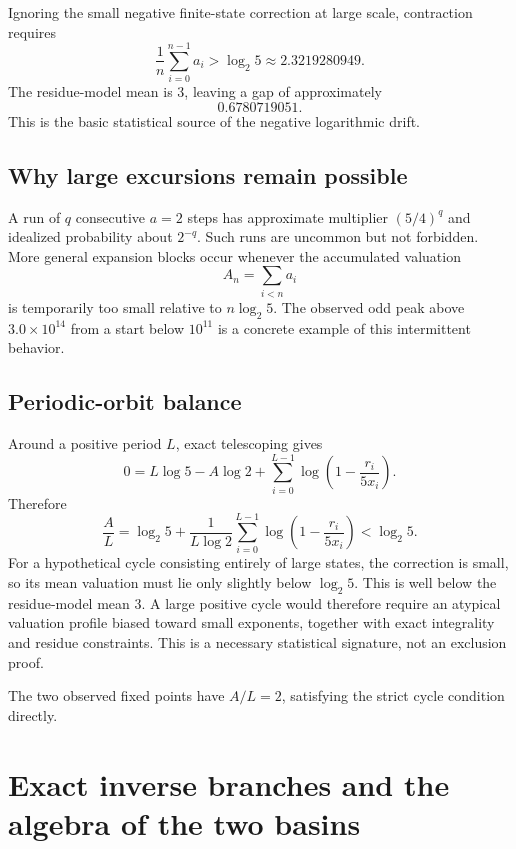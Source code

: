\documentclass[11pt]{article}
\begin{document}
Ignoring the small negative finite-state correction at large scale, contraction requires
\[
\frac1n\sum_{i=0}^{n-1}a_i
>
\log_2 5
\approx2.3219280949.
\]
The residue-model mean is $3$, leaving a gap of approximately
\[
0.6780719051.
\]
This is the basic statistical source of the negative logarithmic drift.

\subsection{Why large excursions remain possible}

A run of $q$ consecutive $a=2$ steps has approximate multiplier $(5/4)^q$ and idealized probability about $2^{-q}$. Such runs are uncommon but not forbidden. More general expansion blocks occur whenever the accumulated valuation
\[
A_n=\sum_{i<n}a_i
\]
is temporarily too small relative to $n\log_2 5$. The observed odd peak above $3.0\times10^{14}$ from a start below $10^{11}$ is a concrete example of this intermittent behavior.

\subsection{Periodic-orbit balance}

Around a positive period $L$, exact telescoping gives
\begin{equation}
0
=
L\log5-A\log2+
\sum_{i=0}^{L-1}
\log\left(1-\frac{r_i}{5x_i}\right).
\end{equation}
Therefore
\begin{equation}
\frac AL
=
\log_2 5+
\frac1{L\log2}
\sum_{i=0}^{L-1}
\log\left(1-\frac{r_i}{5x_i}\right)
<
\log_2 5.
\end{equation}
For a hypothetical cycle consisting entirely of large states, the correction is small, so its mean valuation must lie only slightly below $\log_2 5$. This is well below the residue-model mean $3$. A large positive cycle would therefore require an atypical valuation profile biased toward small exponents, together with exact integrality and residue constraints. This is a necessary statistical signature, not an exclusion proof.

The two observed fixed points have $A/L=2$, satisfying the strict cycle condition directly.

\section{Exact inverse branches and the algebra of the two basins}
\end{document}
